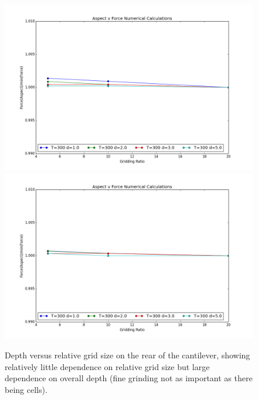 \documentclass[11pt,traditabstract]{article}
\begin{document}
\begin{figure}[h]
\centering
\includegraphics[width=5.5in]{depth_correction}
\includegraphics[width=5.5in]{depth_correction_finite}
\caption{Depth versus relative grid size on the rear of the cantilever, showing relatively little dependence on relative grid size but large dependence on overall depth (fine grinding not as important as there being cells).}\label{fig:depthCorr}
\end{figure}
\end{document}
